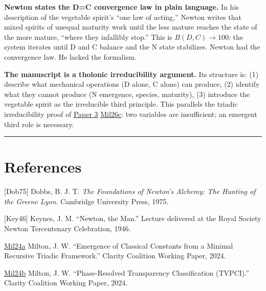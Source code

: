 \documentclass[12pt]{article}
\begin{document}
\textbf{Newton states the D=C convergence law in plain language.} In his
description of the vegetable spirit's ``one law of acting,'' Newton
writes that mixed spirits of unequal maturity work until the less mature
reaches the state of the more mature, ``where they infallibly stop.''
This is \(B(D,C) \to 100\): the system iterates until D and C balance
and the N state stabilizes. Newton had the convergence law. He lacked
the formalism.

\textbf{The manuscript is a tholonic irreducibility argument.} Its
structure is: (1) describe what mechanical operations (D alone, C alone)
can produce, (2) identify what they cannot produce (N emergence,
species, maturity), (3) introduce the vegetable spirit as the
irreducible third principle. This parallels the triadic irreducibility
proof of
\href{https://github.com/baardev/truevalue/blob/main/docnav/Research/papers/3_minimal-recursive-triadic-framework/3_minimal-recursive-triadic-framework.pdf}{Paper
3}
\href{https://github.com/baardev/truevalue/blob/main/docnav/Research/papers/3_minimal-recursive-triadic-framework/3_minimal-recursive-triadic-framework.pdf}{Mil26c}:
two variables are insufficient; an emergent third role is necessary.

\begin{center}\rule{0.5\linewidth}{0.5pt}\end{center}

\section{References}\label{references}

{[}Dob75{]} Dobbs, B. J. T. \emph{The Foundations of Newton's Alchemy:
The Hunting of the Greene Lyon}. Cambridge University Press, 1975.

{[}Key46{]} Keynes, J. M. ``Newton, the Man.'' Lecture delivered at the
Royal Society Newton Tercentenary Celebration, 1946.

\href{https://github.com/baardev/truevalue/blob/main/docnav/Research/papers/1_recursive-tholonic-five-constants/1_recursive-tholonic-five-constants.pdf}{Mil24a}
Milton, J. W. ``Emergence of Classical Constants from a Minimal
Recursive Triadic Framework.'' Clarity Coalition Working Paper, 2024.

\href{https://github.com/baardev/truevalue/blob/main/docnav/Research/papers/2_supply-chain-transparency-tvpci/2_supply-chain-transparency-tvpci.pdf}{Mil24b}
Milton, J. W. ``Phase-Resolved Transparency Classification (TVPCI).''
Clarity Coalition Working Paper, 2024.
\end{document}

